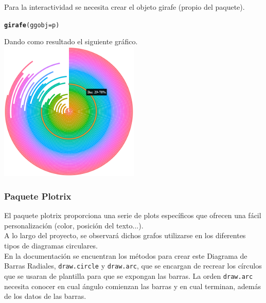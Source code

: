 \documentclass{article}\usepackage[]{graphicx}\usepackage[]{color}
\makeatletter
\newcommand{\hlstd}[1]{\textcolor[rgb]{0.345,0.345,0.345}{#1}}%
\newcommand{\hlkwc}[1]{\textcolor[rgb]{0.333,0.667,0.333}{#1}}%
\newcommand{\hlkwd}[1]{\textcolor[rgb]{0.737,0.353,0.396}{\textbf{#1}}}%
\newenvironment{kframe}{%
 \def\at@end@of@kframe{}%
 \ifinner\ifhmode%
  \def\at@end@of@kframe{\end{minipage}}%
  \begin{minipage}{\columnwidth}%
 \fi\fi%
 \def\FrameCommand##1{\hskip\@totalleftmargin \hskip-\fboxsep
 \colorbox{shadecolor}{##1}\hskip-\fboxsep
     \hskip-\linewidth \hskip-\@totalleftmargin \hskip\columnwidth}%
 \MakeFramed {\advance\hsize-\width
   \@totalleftmargin\z@ \linewidth\hsize
   \@setminipage}}%
 {\par\unskip\endMakeFramed%
 \at@end@of@kframe}
\newenvironment{knitrout}{}{} %
\makeatother
\begin{document}
Para la interactividad se necesita crear el objeto girafe (propio del paquete).
\begin{knitrout}
\color{fgcolor}\begin{kframe}
\begin{alltt}
\hlkwd{girafe}\hlstd{(}\hlkwc{ggobj} \hlstd{= p)}
\end{alltt}
\end{kframe}
\end{knitrout}
Dando como resultado el siguiente gr\'afico.~\\
\vbox{
    \centering
    \includegraphics[width=0.5\textwidth]{imag/bar_interactive}
}
\clearpage
\subsubsection{Paquete Plotrix}
El paquete plotrix proporciona una serie de plots espec\'ificos que ofrecen una f\'acil personalizaci\'on (color, posici\'on del texto...).~\\
A lo largo del proyecto, se observar\'a dichos grafos utilizarse en los diferentes tipos de diagramas circulares.~\\
En la documentaci\'on %
se encuentran los m\'etodos para crear este Diagrama de Barras Radiales, \texttt{draw.circle} y \texttt{draw.arc}, que se encargan de recrear los c\'irculos que se usaran de plantilla para que se expongan las barras. La orden \texttt{draw.arc} necesita conocer en cual \'angulo comienzan las barras y en cual terminan, adem\'as de los datos de las barras.
\end{document}
